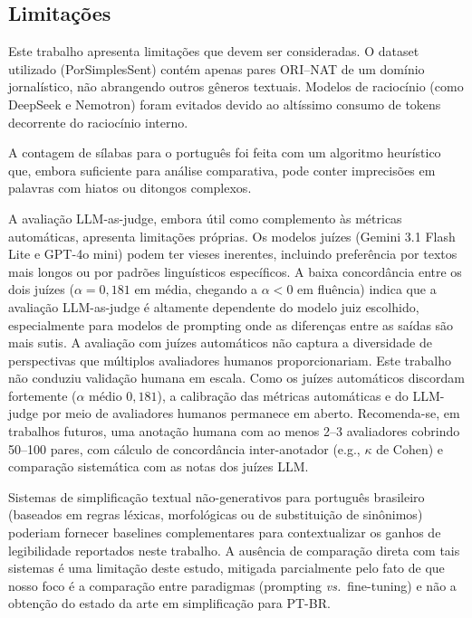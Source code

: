 \documentclass[a4paper, twocolumn, 11pt, twoside]{article}
\begin{document}
\subsection{Limitações}

Este trabalho apresenta limitações que devem ser consideradas. O
dataset utilizado
 (PorSimplesSent) contém apenas pares ORI--NAT de um domínio
jornalístico, não abrangendo outros gêneros textuais. Modelos de
raciocínio (como DeepSeek e Nemotron) foram evitados devido ao
altíssimo consumo de tokens decorrente do raciocínio interno.

A contagem de sílabas para o português foi feita com um algoritmo
heurístico que, embora suficiente para análise comparativa, pode conter
imprecisões em palavras com hiatos ou ditongos complexos.

A avaliação LLM-as-judge, embora útil como complemento às
métricas automáticas, apresenta limitações próprias. Os
modelos juízes (Gemini 3.1 Flash Lite e GPT-4o mini) podem ter vieses
inerentes, incluindo preferência por textos mais longos ou por padrões
linguísticos específicos. A baixa concordância entre os dois juízes
($\alpha = 0,181$ em média, chegando a $\alpha < 0$ em fluência)
indica que a avaliação LLM-as-judge é altamente dependente do modelo
juiz escolhido, especialmente para modelos de prompting onde as
diferenças entre as saídas são mais sutis. A avaliação com
juízes automáticos não captura a diversidade de perspectivas que
múltiplos avaliadores humanos proporcionariam.
%
Este trabalho não conduziu validação humana em escala. Como os
juízes automáticos discordam fortemente
($\alpha$ médio $0{,}181$), a calibração das métricas automáticas
e do LLM-judge por meio de avaliadores humanos permanece em aberto.
Recomenda-se, em trabalhos futuros, uma anotação humana com ao
menos 2--3 avaliadores cobrindo 50--100 pares, com cálculo de
concordância inter-anotador (e.g., $\kappa$ de Cohen) e
comparação sistemática com as notas dos juízes LLM.

Sistemas de simplificação textual não-generativos para português
brasileiro (baseados em regras léxicas, morfológicas ou de
substituição de sinônimos) poderiam fornecer baselines
complementares para contextualizar os ganhos de legibilidade
reportados neste trabalho. A ausência de comparação direta
com tais sistemas é uma limitação deste estudo, mitigada
parcialmente pelo fato de que nosso foco é a comparação entre
paradigmas (prompting \emph{vs.}~fine-tuning) e não a obtenção
do estado da arte em simplificação para PT-BR.
\end{document}
